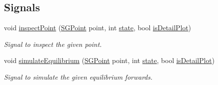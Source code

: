 \subsection*{Signals}
\begin{DoxyCompactItemize}
\item 
\mbox{\label{classSGCustomPlot_a23f808cae1e818047ef19fb2f81b2640}} 
void \hyperlink{classSGCustomPlot_a23f808cae1e818047ef19fb2f81b2640}{inspect\+Point} (\hyperlink{classSGPoint}{S\+G\+Point} point, int \hyperlink{classSGCustomPlot_ac17b8dfc3d9579e6286efa060ca55ab0}{state}, bool \hyperlink{classSGCustomPlot_a216325e80035b2042215a6ad9cd82202}{is\+Detail\+Plot})
\begin{DoxyCompactList}\small\item\em Signal to inspect the given point. \end{DoxyCompactList}\item 
\mbox{\label{classSGCustomPlot_ab8369e075314ff6d557f433b25b6852c}} 
void \hyperlink{classSGCustomPlot_ab8369e075314ff6d557f433b25b6852c}{simulate\+Equilibrium} (\hyperlink{classSGPoint}{S\+G\+Point} point, int \hyperlink{classSGCustomPlot_ac17b8dfc3d9579e6286efa060ca55ab0}{state}, bool \hyperlink{classSGCustomPlot_a216325e80035b2042215a6ad9cd82202}{is\+Detail\+Plot})
\begin{DoxyCompactList}\small\item\em Signal to simulate the given equilibrium forwards. \end{DoxyCompactList}\end{DoxyCompactItemize}
